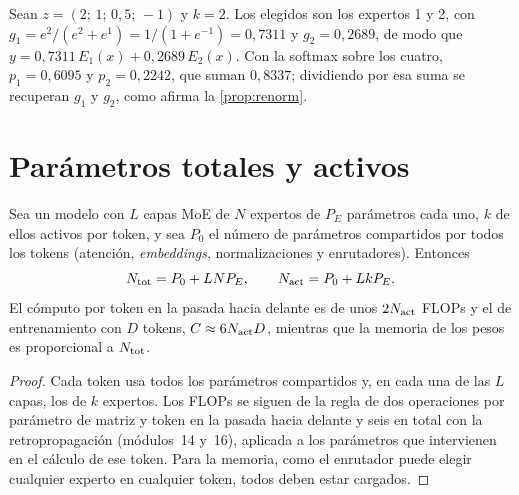 \begin{ejemplo}\label{ej:router}
Sean $z=(2;\,1;\,0{,}5;\,-1)$ y $k=2$. Los elegidos son los expertos 1 y 2, con $g_1=e^{2}/(e^{2}+e^{1})=1/(1+e^{-1})=0{,}7311$ y $g_2=0{,}2689$, de modo que $y=0{,}7311\,E_1(x)+0{,}2689\,E_2(x)$. Con la softmax sobre los cuatro, $p_1=0{,}6095$ y $p_2=0{,}2242$, que suman $0{,}8337$; dividiendo por esa suma se recuperan $g_1$ y $g_2$, como afirma la \cref{prop:renorm}.
\end{ejemplo}

\section{Parámetros totales y activos}

\begin{proposicion}\label{prop:activos}
Sea un modelo con $L$ capas MoE de $N$ expertos de $P_E$ parámetros cada uno, $k$ de ellos activos por token, y sea $P_0$ el número de parámetros compartidos por todos los tokens (atención, \emph{embeddings}, normalizaciones y enrutadores). Entonces
\[
N_{\mathrm{tot}}=P_0+LNP_E,\qquad N_{\mathrm{act}}=P_0+LkP_E .
\]
El cómputo por token en la pasada hacia delante es de unos $2N_{\mathrm{act}}$ FLOPs y el de entrenamiento con $D$ tokens, $C\approx 6N_{\mathrm{act}} D$, mientras que la memoria de los pesos es proporcional a $N_{\mathrm{tot}}$.
\end{proposicion}

\begin{proof}
Cada token usa todos los parámetros compartidos y, en cada una de las $L$ capas, los de $k$ expertos. Los FLOPs se siguen de la regla de dos operaciones por parámetro de matriz y token en la pasada hacia delante y seis en total con la retropropagación (módulos~14 y~16), aplicada a los parámetros que intervienen en el cálculo de ese token. Para la memoria, como el enrutador puede elegir cualquier experto en cualquier token, todos deben estar cargados.
\end{proof}

